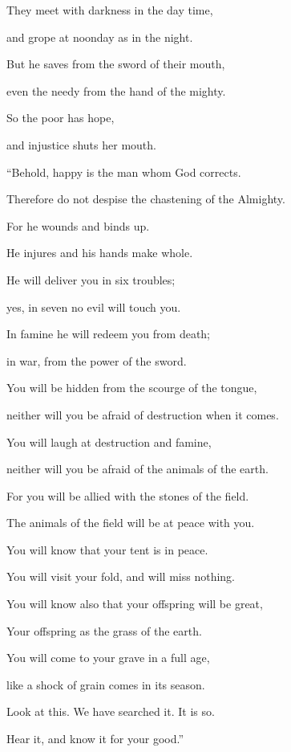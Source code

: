 {\par }{\Q {}They meet with darkness in the day time,
\par }{\QB and grope at noonday as in the night.
\par }{\Q {}But he saves from the sword of their mouth,
\par }{\QB even the needy from the hand of the mighty.
\par }{\Q {}So the poor has hope,
\par }{\QB and injustice shuts her mouth.
\par }{\BB \par }{\Q {}“Behold, happy is the man whom God corrects.
\par }{\QB Therefore do not despise the chastening of the Almighty.
\par }{\Q {}For he wounds and binds up.
\par }{\QB He injures and his hands make whole.
\par }{\Q {}He will deliver you in six troubles;
\par }{\QB yes, in seven no evil will touch you.
\par }{\Q {}In famine he will redeem you from death;
\par }{\QB in war, from the power of the sword.
\par }{\Q {}You will be hidden from the scourge of the tongue,
\par }{\QB neither will you be afraid of destruction when it comes.
\par }{\Q {}You will laugh at destruction and famine,
\par }{\QB neither will you be afraid of the animals of the earth.
\par }{\Q {}For you will be allied with the stones of the field.
\par }{\QB The animals of the field will be at peace with you.
\par }{\Q {}You will know that your tent is in peace.
\par }{\QB You will visit your fold, and will miss nothing.
\par }{\Q {}You will know also that your offspring will be great,
\par }{\QB Your offspring as the grass of the earth.
\par }{\Q {}You will come to your grave in a full age,
\par }{\QB like a shock of grain comes in its season.
\par }{\Q {}Look at this. We have searched it. It is so.
\par }{\QB Hear it, and know it for your good.”
\par }{\BB \par }
